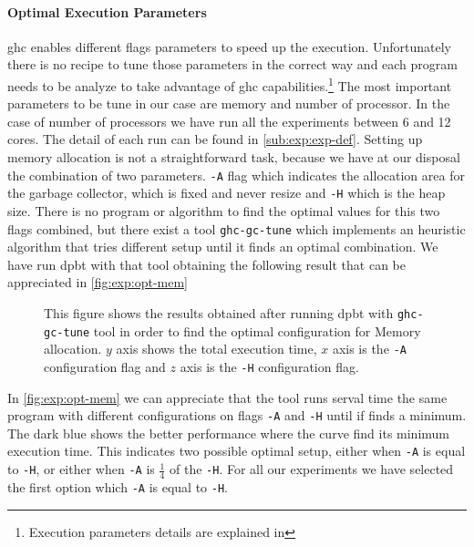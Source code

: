 \paragraph{Optimal Execution Parameters}\label{par:ex:param} \acrshort{ghc} enables different flags parameters to speed up the execution. Unfortunately there is no recipe to tune those parameters in the correct way and each program needs to be analyze to take advantage of \acrshort{ghc} capabilities.\footnote{Execution parameters details are explained in }
The most important parameters to be tune in our case are memory and number of processor. In the case of number of processors we have run all the experiments between 6 and 12 cores. The detail of each run can be found in \autoref{sub:exp:exp-def}.
Setting up memory allocation is not a straightforward task, because we have at our disposal the combination of two parameters. \texttt{-A} flag which indicates the allocation area for the garbage collector, which is fixed and never resize and \texttt{-H} which is the heap size. There is no program or algorithm to find the optimal values for this two flags combined, but there exist a tool \texttt{ghc-gc-tune} \cite{ghctune} 
which implements an heuristic algorithm that tries different setup until it finds an optimal combination.
We have run \acrshort{dpbt} with that tool obtaining the following result that can be appreciated in \autoref{fig:exp:opt-mem}

\begin{figure}[h!]
  \centering  
\caption[$\dpbt$ Finding Optimal Memory Setup]{This figure shows the results obtained after running \acrshort{dpbt} with \texttt{ghc-gc-tune} tool in order to find the optimal configuration for Memory allocation. $y$ axis shows the total execution time, $x$ axis is the \texttt{-A} configuration flag and $z$ axis is the \texttt{-H} configuration flag.}
\label{fig:exp:opt-mem}
\end{figure}

In \autoref{fig:exp:opt-mem} we can appreciate that the tool runs serval time the same program with different configurations on flags \texttt{-A} and \texttt{-H} until if finds a minimum. The dark blue shows the better performance where the curve find its minimum execution time. 
This indicates two possible optimal setup, either when \texttt{-A} is equal to \texttt{-H}, or either when \texttt{-A} is $\frac{1}{4}$ of the \texttt{-H}. For all our experiments we have selected the first option which \texttt{-A} is equal to \texttt{-H}.

